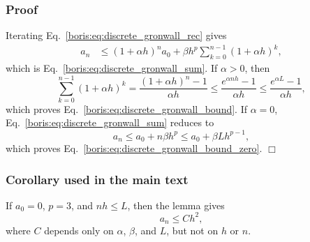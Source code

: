 \subsubsection{Proof}
Iterating Eq.~\eqref{boris:eq:discrete_gronwall_rec} gives
\begin{align*}
a_n
&\le (1+\alpha h)^n a_0
+ \beta h^p \sum_{k=0}^{n-1}(1+\alpha h)^k,
\end{align*}
which is Eq.~\eqref{boris:eq:discrete_gronwall_sum}.
If \(\alpha>0\), then
\[
\sum_{k=0}^{n-1}(1+\alpha h)^k
= \frac{(1+\alpha h)^n-1}{\alpha h}
\le \frac{e^{\alpha nh}-1}{\alpha h}
\le \frac{e^{\alpha L}-1}{\alpha h},
\]
which proves Eq.~\eqref{boris:eq:discrete_gronwall_bound}.
If \(\alpha=0\), Eq.~\eqref{boris:eq:discrete_gronwall_sum} reduces to
\[
a_n\le a_0 + n\beta h^p \le a_0 + \beta L h^{p-1},
\]
which proves Eq.~\eqref{boris:eq:discrete_gronwall_bound_zero}. \hfill\(\Box\)

\subsubsection{Corollary used in the main text}
If \(a_0=0\), \(p=3\), and \(nh\le L\), then the lemma gives
\[
a_n \le C h^2,
\]
where \(C\) depends only on \(\alpha\), \(\beta\), and \(L\), but not on \(h\)
or \(n\).
